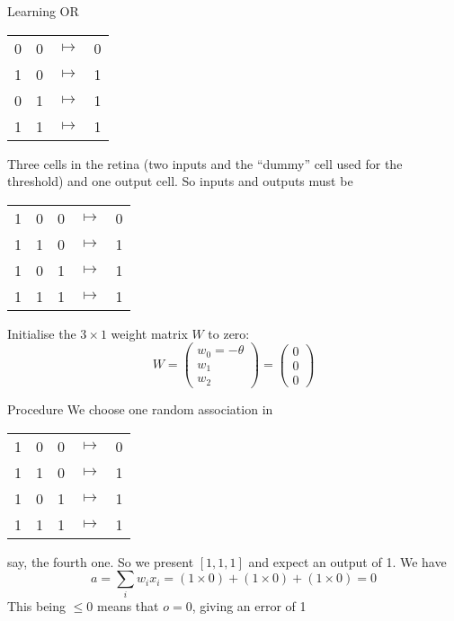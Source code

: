 \documentclass[aspectratio=169]{beamer}\usepackage[]{graphicx}\usepackage[]{xcolor}
\begin{document}
\begin{frame}{Learning OR}
    \begin{center}
        \begin{tabular}{cccc}
            0 & 0 & $\mapsto$ & 0 \\
            1 & 0 & $\mapsto$ & 1 \\
            0 & 1 & $\mapsto$ & 1 \\
            1 & 1 & $\mapsto$ & 1 \\
        \end{tabular}
    \end{center}
    Three cells in the retina (two inputs and the ``dummy'' cell used for the threshold) and one output cell. So inputs and outputs must be
    \begin{center}
        \begin{tabular}{ccccc}
            1 & 0 & 0 & $\mapsto$ & 0 \\
            1 & 1 & 0 & $\mapsto$ & 1 \\
            1 & 0 & 1 & $\mapsto$ & 1 \\
            1 & 1 & 1 & $\mapsto$ & 1 \\
        \end{tabular}
    \end{center}
    Initialise the $3\times 1$ weight matrix $W$ to zero:
    \[
        W=\begin{pmatrix}
            w_0 = -\theta \\
            w_1 \\ w_2
        \end{pmatrix}
        = \begin{pmatrix}
            0\\ 0\\ 0
        \end{pmatrix}
    \]
\end{frame}


\begin{frame}{Procedure}
    We choose one random association in 
    \begin{center}
        \begin{tabular}{ccccc}
            1 & 0 & 0 & $\mapsto$ & 0 \\
            1 & 1 & 0 & $\mapsto$ & 1 \\
            1 & 0 & 1 & $\mapsto$ & 1 \\
            1 & 1 & 1 & $\mapsto$ & 1 \\
        \end{tabular}
    \end{center}
    say, the fourth one. So we present $[1,1,1]$ and expect an output of 1. We have
    \[
        a = \sum_i w_ix_i = (1\times 0)+(1\times 0)+(1\times 0) = 0
    \]
    This being $\leq 0$ means that $o=0$, giving an error of 1
\end{frame}
\end{document}
